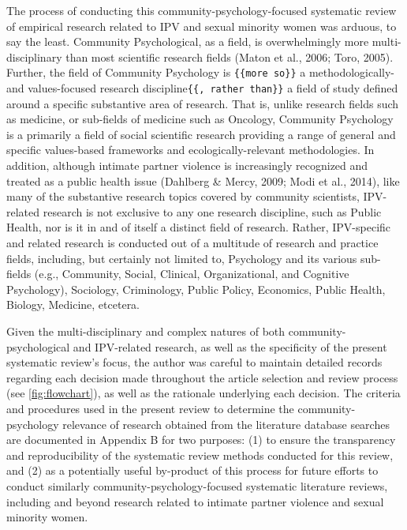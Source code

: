 \documentclass[11pt,]{tufte-book}
\begin{document}
The process of conducting this community-psychology-focused systematic
review of empirical research related to IPV and sexual minority women
was arduous, to say the least. Community Psychological, as a field, is
overwhelmingly more multi-disciplinary than most scientific research
fields (Maton et al., 2006; Toro, 2005). Further, the field of Community
Psychology is \texttt{\{\{more\ so\}\}} a methodologically- and
values-focused research discipline\texttt{\{\{,\ rather\ than\}\}} a
field of study defined around a specific substantive area of research.
That is, unlike research fields such as medicine, or sub-fields of
medicine such as Oncology, Community Psychology is a primarily a field
of social scientific research providing a range of general and specific
values-based frameworks and ecologically-relevant methodologies. In
addition, although intimate partner violence is increasingly recognized
and treated as a public health issue (Dahlberg \& Mercy, 2009; Modi et
al., 2014), like many of the substantive research topics covered by
community scientists, IPV-related research is not exclusive to any one
research discipline, such as Public Health, nor is it in and of itself a
distinct field of research. Rather, IPV-specific and related research is
conducted out of a multitude of research and practice fields, including,
but certainly not limited to, Psychology and its various sub-fields
(e.g., Community, Social, Clinical, Organizational, and Cognitive
Psychology), Sociology, Criminology, Public Policy, Economics, Public
Health, Biology, Medicine, etcetera.

Given the multi-disciplinary and complex natures of both
community-psychological and IPV-related research, as well as the
specificity of the present systematic review's focus, the author was
careful to maintain detailed records regarding each decision made
throughout the article selection and review process (see
\cref{fig:flowchart}), as well as the rationale
underlying each decision. The criteria and procedures used in the
present review to determine the community-psychology relevance of
research obtained from the literature database searches are documented
in Appendix B for two purposes: (1) to ensure the transparency and
reproducibility of the systematic review methods conducted for this
review, and (2) as a potentially useful by-product of this process for
future efforts to conduct similarly community-psychology-focused
systematic literature reviews, including and beyond research related to
intimate partner violence and sexual minority women.
\end{document}
